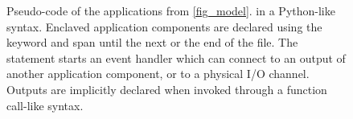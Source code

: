 \begin{figure}[ht]
  \begin{centering}
  \hfill
  \hfill
  \hfill\mbox{}
  \caption[Pseudocode of our running example in a
  Python-like syntax]{ Pseudo-code of the applications from \cref{fig_model}. in a
    Python-like syntax. Enclaved application components are declared using the
     keyword and span until the next  or the end of
    the file. The  statement starts an event handler which can connect
    to an output of another application component, or to a physical I/O channel.
    Outputs are implicitly declared when invoked through a function call-like
    syntax. }
  \label{code:examples}
  \end{centering}
\end{figure}
